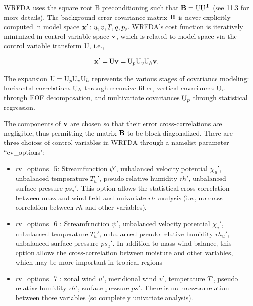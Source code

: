 WRFDA uses the square root B preconditioning such that ${\bf B} = {\rm U} {\rm U^T} $ (see 11.3 for more details). 
The background error covariance matrix ${\bf B}$ is never explicitly computed in model space ${\bf x}': u, v, T, q, p_{s}$.  WRFDA's cost function is iteratively minimized in 
control variable space ${\bf v}$, which is related to model space via the control variable transform ${\rm U}$, 
i.e.,

\begin{equation}
{\bf x}' = {\rm U}{\bf v}= {\rm U}_{p} {\rm U}_{v} {\rm U}_{h}{\bf v}.
\label{var-cv}
\end{equation}

The expansion ${\rm U}={\rm U}_{p} 
{\rm U}_{v} {\rm U}_{h}$ represents the various stages of covariance modeling: horizontal correlations ${\rm U}_{h}$ through 
recursive filter, vertical covariances ${\rm U}_{v}$ through EOF decomposation, and multivariate covariances
${\rm U}_{p}$ through statistical regression.

The components of ${\bf v}$ are chosen so that their error cross-correlations are negligible, 
thus permitting the matrix ${\bf B}$ to be block-diagonalized. There are three choices of control variables in WRFDA
through a namelist parameter ``cv\_options":
\begin{itemize}\setlength{\parskip}{-4pt}
\item
 cv\_options=5: Streamfunction $\psi'$, unbalanced velocity potential $\chi_u'$, 
unbalanced temperature $T_u'$, pseudo relative humidity $rh'$, unbalanced surface pressure $ps_u'$. 
This option allows the statistical cross-correlation between mass and wind field and univariate $rh$ analysis 
(i.e., no cross correlation between $rh$ and other variables).

\item
 cv\_options=6 \citep{chen13}: Streamfunction $\psi'$, unbalanced velocity potential $\chi_u'$, 
unbalanced temperature $T_u'$, unbalanced pseudo relative humidity $rh_u'$, unbalanced surface pressure $ps_u'$.
In addition to mass-wind balance, this option allows the cross-correlation between moisture and other variables, which
may be more important in tropical regions.

\item
 cv\_options=7 \citep{sun15}: zonal wind $u'$, meridional wind $v'$, temperature $T'$, pseudo relative humidity $rh'$, 
 surface pressure $ps'$. There is no cross-correlation between those variables (so completely univariate analysis).
\end{itemize}

